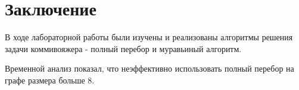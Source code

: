 \chapter*{Заключение}

В ходе лабораторной работы были изучены и реализованы алгоритмы решения задачи коммивояжера - полный перебор и муравьиный алгоритм.

Временной анализ показал, что неэффективно использовать полный перебор на графе размера больше 8.